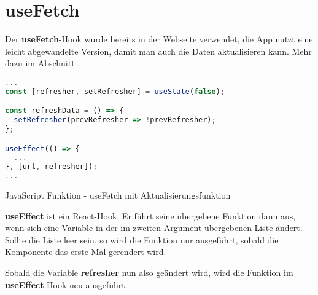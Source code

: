 \section{useFetch}
Der \textbf{useFetch}-Hook wurde bereits in der Webseite verwendet, die App nutzt eine leicht abgewandelte
Version, damit man auch die Daten aktualisieren kann. Mehr dazu im Abschnitt \underline{}.

\begin{code}[htp]
\begin{lstlisting}[firstnumber=1,language=JavaScript, style=JSX]
...
const [refresher, setRefresher] = useState(false);

const refreshData = () => {
  setRefresher(prevRefresher => !prevRefresher);
};

useEffect(() => {
  ...
}, [url, refresher]);
...
\end{lstlisting}
\caption{JavaScript Funktion - useFetch mit Aktualisierungsfunktion}
\end{code}

\textbf{useEffect} ist ein React-Hook. Er führt seine übergebene Funktion dann aus, wenn sich eine Variable
in der im zweiten Argument übergebenen Liste ändert. Sollte die Liste leer sein, so wird die
Funktion nur ausgeführt, sobald die Komponente das erste Mal gerendert wird.

Sobald die Variable \textbf{refresher} nun also geändert wird, wird die Funktion im \textbf{useEffect}-Hook neu
ausgeführt.